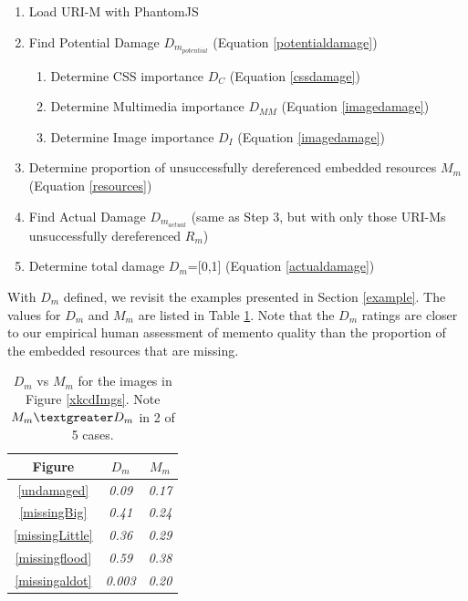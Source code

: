 \begin{enumerate}
  \item Load URI-M with PhantomJS
  \item Find Potential Damage $D_{m_{potential}}$ (Equation \ref{potentialdamage})
  \begin{enumerate}
	\item Determine CSS importance $D_C$ (Equation \ref{cssdamage})
	\item Determine Multimedia importance $D_{MM}$ (Equation \ref{imagedamage})
	\item Determine Image importance $D_I$ (Equation \ref{imagedamage})
  \end{enumerate}
  \item Determine proportion of unsuccessfully dereferenced embedded resources $M_m$ (Equation \ref{resources})
  \item Find Actual Damage $D_{m_{actual}}$ (same as Step 3, but with only those URI-Ms unsuccessfully dereferenced $R_m$)
  \item Determine total damage $D_m$=[0,1] (Equation \ref{actualdamage})
  \
\end{enumerate}


With $D_m$ defined, we revisit the examples presented in Section \ref{example}. The values for $D_m$ and $M_m$ are listed in Table \ref{damageTable}. Note that the $D_m$ ratings are closer to our empirical human assessment of memento quality than the proportion of the embedded resources that are missing.

\begin{table}
\centering
\begin{tabular}{ c | c | c }
    \hline
    Figure & $D_m$ & $M_m$\\
    \hline
    \hline
\ref{undamaged} & \emph{0.09} & \emph{0.17}\\
\ref{missingBig} & \emph{0.41} & \emph{0.24}\\
\ref{missingLittle} & \emph{0.36} & \emph{0.29}\\
\ref{missingflood} & \emph{0.59} & \emph{0.38}\\
\ref{missingaldot} & \emph{0.003} & \emph{0.20}\\
    \hline
\end{tabular}
  \caption{$D_m$ vs $M_m$ for the images in Figure \ref{xkcdImgs}. Note $M_m \textgreater D_m$ in 2 of 5 cases.}
  \label{damageTable}
\end{table}

